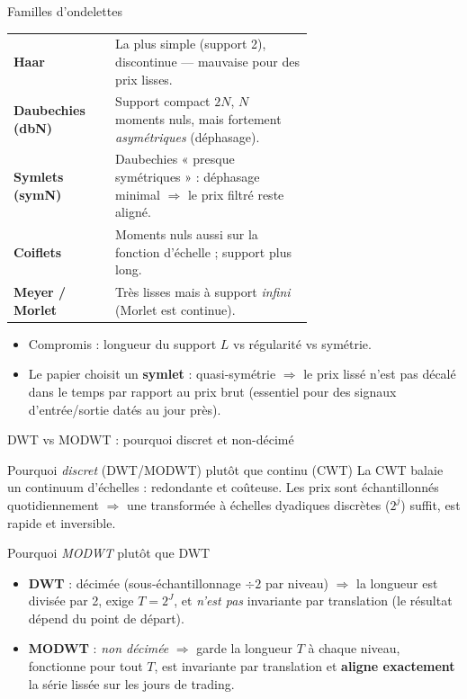 \documentclass[10pt,aspectratio=169]{beamer}
\begin{document}
\begin{frame}{Familles d'ondelettes}
  \small
  \begin{tabular}{>{\bfseries}l p{0.66\linewidth}}
    \toprule
    Haar          & La plus simple (support 2), discontinue --- mauvaise pour des prix lisses. \\
    Daubechies (dbN) & Support compact $2N$, $N$ moments nuls, mais fortement \emph{asymétriques} (déphasage). \\
    Symlets (symN)   & Daubechies « presque symétriques » : déphasage minimal $\Rightarrow$ le prix filtré reste aligné. \\
    Coiflets         & Moments nuls aussi sur la fonction d'échelle ; support plus long. \\
    Meyer / Morlet   & Très lisses mais à support \emph{infini} (Morlet est continue). \\
    \bottomrule
  \end{tabular}
  \vskip6pt
  \begin{itemize}\setlength{\itemsep}{2pt}
    \item Compromis : longueur du support $L$ \;vs\; régularité \;vs\; symétrie.
    \item Le papier choisit un \textbf{symlet} : quasi-symétrie $\Rightarrow$
          le prix lissé n'est pas décalé dans le temps par rapport au prix brut
          (essentiel pour des signaux d'entrée/sortie datés au jour près).
  \end{itemize}
\end{frame}

\begin{frame}{DWT vs MODWT : pourquoi discret et non-décimé}
  \small
  \begin{block}{Pourquoi \emph{discret} (DWT/MODWT) plutôt que continu (CWT)}
    La CWT balaie un continuum d'échelles : redondante et coûteuse. Les prix
    sont échantillonnés quotidiennement $\Rightarrow$ une transformée à
    échelles dyadiques discrètes ($2^j$) suffit, est rapide et inversible.
  \end{block}
  \begin{block}{Pourquoi \emph{MODWT} plutôt que DWT}
    \begin{itemize}\setlength{\itemsep}{2pt}
      \item \textbf{DWT} : décimée (sous-échantillonnage $\div 2$ par niveau)
            $\Rightarrow$ la longueur est divisée par 2, exige $T = 2^J$, et
            \emph{n'est pas} invariante par translation (le résultat dépend du
            point de départ).
      \item \textbf{MODWT} : \emph{non décimée} $\Rightarrow$ garde la longueur
            $T$ à chaque niveau, fonctionne pour tout $T$, est invariante par
            translation et \textbf{aligne exactement} la série lissée sur les
            jours de trading.
    \end{itemize}
  \end{block}
\end{frame}
\end{document}
